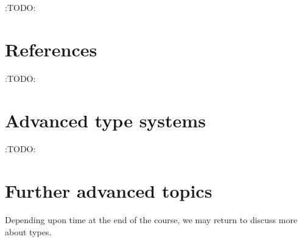 \documentclass[11pt]{article}
\theoremstyle{definition}
\begin{document}
:TODO:

\section{References}
\label{sec:orgae353d3}

:TODO:

\section{Advanced type systems}
\label{sec:org241e51a}

:TODO:

\section{Further advanced topics}
\label{sec:org9cbe85d}

Depending upon time at the end of the course,
we may return to discuss more about types.
\end{document}
